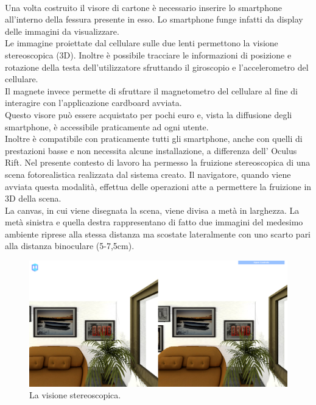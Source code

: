 \\
Una volta costruito il visore di cartone è necessario inserire lo smartphone all’interno della fessura presente in esso. Lo smartphone funge infatti da display delle immagini da visualizzare.
\\
Le immagine proiettate dal cellulare sulle due lenti permettono la visione stereoscopica (3D).
Inoltre è possibile tracciare le informazioni di posizione e rotazione della testa dell’utilizzatore sfruttando il giroscopio e l’accelerometro del cellulare. 
\\
Il magnete invece permette di sfruttare il magnetometro del cellulare al fine di interagire con l’applicazione cardboard avviata.
\\
Questo visore può essere acquistato per pochi euro e, vista la diffusione degli smartphone, è accessibile praticamente ad ogni utente. 
\\
Inoltre è compatibile con praticamente tutti gli smartphone, anche con quelli di prestazioni basse e non necessita alcune installazione, a differenza dell’ Oculus Rift.
Nel presente contesto di lavoro ha permesso la fruizione stereoscopica di una scena fotorealistica realizzata dal sistema creato.
Il navigatore, quando viene avviata questa modalità, effettua delle operazioni atte a permettere la fruizione in 3D della scena. 
\\
La canvas, in cui viene disegnata la scena, viene divisa a metà in larghezza. La metà sinistra e  quella destra rappresentano di fatto due immagini del medesimo ambiente riprese alla stessa distanza ma scostate lateralmente con uno scarto pari alla distanza binoculare (5-7,5cm).
\begin{figure}[htb]
 \centering
 \includegraphics[width=1\linewidth]{images/chapter_navigazione_scena/immag_virt.png}\hfill
 \caption[Visione stereoscopica.]{La visione stereoscopica.}
 \label{fig:navigazione_scena_navigator_immag_virt}
\end{figure}
